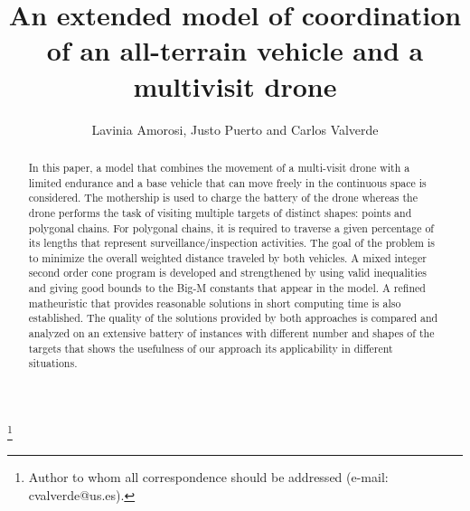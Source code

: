 \documentclass{itor}
\theoremstyle{definition}
\theoremstyle{remark}
\begin{document}
\title{An extended model of coordination of an all-terrain vehicle and a multivisit drone}


\author[Running Author]{Lavinia Amorosi,  Justo Puerto and Carlos Valverde}


\thanks{\affmark{$\ast$}Author to whom all correspondence should be addressed (e-mail: cvalverde@us.es).}


\begin{abstract}
In this paper, a model that combines the movement of a multi-visit drone with a limited endurance and a base vehicle that can move freely in the continuous space is considered. The mothership is used to charge the battery of the drone whereas the drone performs the task of visiting multiple targets of distinct shapes: points and polygonal chains. For polygonal chains, it is required to traverse a given percentage of its lengths that represent surveillance/inspection activities. The goal of the problem is to minimize the overall weighted distance traveled by both vehicles. A mixed integer second order cone program is developed and strengthened by using valid inequalities and giving good bounds to the Big-M constants that appear in the model. A refined matheuristic that provides reasonable solutions in short computing time is also established. The quality of the solutions provided by both approaches is compared and analyzed on an extensive battery of instances with different number and shapes of the targets that shows the usefulness of our approach its applicability in different situations.
\end{abstract}


\maketitle
\end{document}
